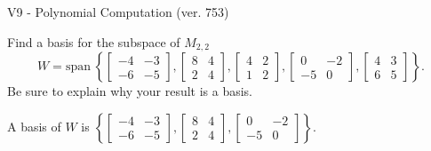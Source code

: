 \begin{exercise}
  \begin{exerciseTitle}V9 - Polynomial Computation (ver. 753)\end{exerciseTitle}
  \begin{exerciseStatement}
    Find a basis for the subspace of \(M_{2,2}\) 
\[W=\mathrm{span}\ \left\{\left[\begin{array}{cc}
-4 & -3 \\
-6 & -5
\end{array}\right] , \left[\begin{array}{cc}
8 & 4 \\
2 & 4
\end{array}\right] , \left[\begin{array}{cc}
4 & 2 \\
1 & 2
\end{array}\right] , \left[\begin{array}{cc}
0 & -2 \\
-5 & 0
\end{array}\right] , \left[\begin{array}{cc}
4 & 3 \\
6 & 5
\end{array}\right]\right\}.\]
 Be sure to explain why your result is a basis.


  \end{exerciseStatement}
  \begin{exerciseAnswer}
   A basis of \(W\) is  \(\left\{\left[\begin{array}{cc}
-4 & -3 \\
-6 & -5
\end{array}\right] , \left[\begin{array}{cc}
8 & 4 \\
2 & 4
\end{array}\right] , \left[\begin{array}{cc}
0 & -2 \\
-5 & 0
\end{array}\right]\right\}\).
  


  \end{exerciseAnswer}
\end{exercise}